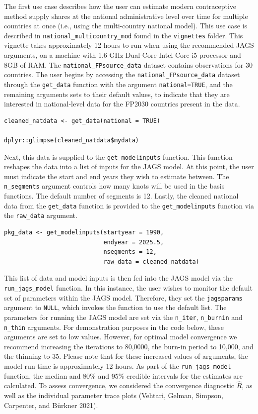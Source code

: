 The first use case describes how the user can estimate modern contraceptive method supply shares at the national administrative level over time for multiple countries at once (i.e., using the multi-country national model). This use case is described in \texttt{national\_multicountry\_mod} found in the \texttt{vignettes} folder. This vignette takes approximately 12 hours to run when using the recommended JAGS arguments, on a machine with 1.6 GHz Dual-Core Intel Core i5 processor and 8GB of RAM. The \texttt{national\_FPsource\_data} dataset contains observations for 30 countries. The user begins by accessing the \texttt{national\_FPsource\_data} dataset through the \texttt{get\_data} function with the argument \texttt{national=TRUE}, and the remaining arguments sets to their default values, to indicate that they are interested in national-level data for the FP2030 countries present in the data.

\begin{verbatim}
cleaned_natdata <- get_data(national = TRUE)

dplyr::glimpse(cleaned_natdata$mydata)
\end{verbatim}

Next, this data is supplied to the \texttt{get\_modelinputs} function. This function reshapes the data into a list of inputs for the JAGS model. At this point, the user must indicate the start and end years they wish to estimate between. The \texttt{n\_segments} argument controls how many knots will be used in the basis functions. The default number of segments is 12. Lastly, the cleaned national data from the \texttt{get\_data} function is provided to the \texttt{get\_modelinputs} function via the \texttt{raw\_data} argument.

\begin{verbatim}
pkg_data <- get_modelinputs(startyear = 1990, 
                            endyear = 2025.5, 
                            nsegments = 12, 
                            raw_data = cleaned_natdata)
\end{verbatim}

This list of data and model inputs is then fed into the JAGS model via the \texttt{run\_jags\_model} function. In this instance, the user wishes to monitor the default set of parameters within the JAGS model. Therefore, they set the \texttt{jagsparams} argument to \texttt{NULL}, which invokes the function to use the default list. The parameters for running the JAGS model are set via the \texttt{n\_iter}, \texttt{n\_burnin} and \texttt{n\_thin} arguments. For demonstration purposes in the code below, these arguments are set to low values. However, for optimal model convergence we recommend increasing the iterations to 80,0000, the burn-in period to 10,000, and the thinning to 35. Please note that for these increased values of arguments, the model run time is approximately 12 hours. As part of the \texttt{run\_jags\_model} function, the median and 80\% and 95\% credible intervals for the estimates are calculated. To assess convergence, we considered the convergence diagnostic \(\hat{R}\), as well as the individual parameter trace plots (Vehtari, Gelman, Simpson, Carpenter, and Bürkner 2021).

